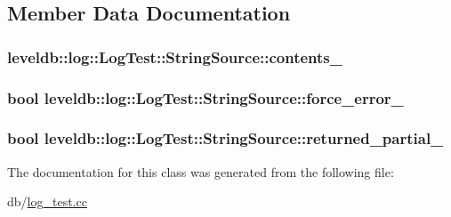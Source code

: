 \subsection{Member Data Documentation}
\hypertarget{classleveldb_1_1log_1_1_log_test_1_1_string_source_aedd5386ec3e8dcbb9027d2b80702fc78}{
\subsubsection[{contents\-\_\-}]{ leveldb\-::log\-::\-Log\-Test\-::\-String\-Source\-::contents\-\_\-}}\label{classleveldb_1_1log_1_1_log_test_1_1_string_source_aedd5386ec3e8dcbb9027d2b80702fc78}
\hypertarget{classleveldb_1_1log_1_1_log_test_1_1_string_source_aac39696e05d613c6123bbae4455c7c27}{
\subsubsection[{force\-\_\-error\-\_\-}]{\setlength{\rightskip}{0pt plus 5cm}bool leveldb\-::log\-::\-Log\-Test\-::\-String\-Source\-::force\-\_\-error\-\_\-}}\label{classleveldb_1_1log_1_1_log_test_1_1_string_source_aac39696e05d613c6123bbae4455c7c27}
\hypertarget{classleveldb_1_1log_1_1_log_test_1_1_string_source_aded237672ac96477565daa85e7c16d71}{
\subsubsection[{returned\-\_\-partial\-\_\-}]{\setlength{\rightskip}{0pt plus 5cm}bool leveldb\-::log\-::\-Log\-Test\-::\-String\-Source\-::returned\-\_\-partial\-\_\-}}\label{classleveldb_1_1log_1_1_log_test_1_1_string_source_aded237672ac96477565daa85e7c16d71}


The documentation for this class was generated from the following file\-:\begin{DoxyCompactItemize}
\item 
db/\hyperlink{log__test_8cc}{log\-\_\-test.\-cc}\end{DoxyCompactItemize}
